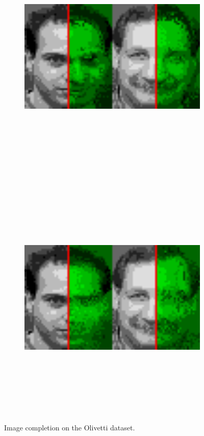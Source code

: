 \documentclass[final,hyperref={pdfpagelabels=false},notheorems]{beamer}
\theoremstyle{thesisstyle}
\begin{document}
\begin{frame}[t]
\begin{columns}[t]
\begin{column}{.5225\textwidth}
\begin{block}{}
      \begin{figure}[h]
        \begin{subfigure}{.5\textwidth}
          \centering\includegraphics[height=12cm]{imgs/cmpl_1.png}
        \end{subfigure}\begin{subfigure}{.5\textwidth}
          \centering\includegraphics[height=12cm]{imgs/cmpl_2.png}
        \end{subfigure}
        \caption{Image completion on the Olivetti dataset.}
      \end{figure}


\end{block}
\end{column}
\end{columns}
\end{frame}
\end{document}
